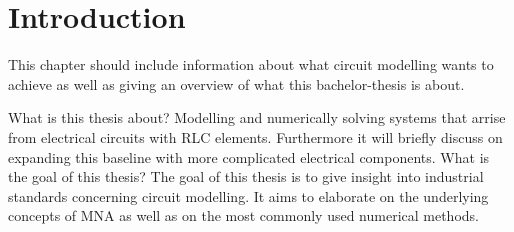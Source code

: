 \section{Introduction}
	This chapter should include information about what circuit modelling wants to achieve as well as giving an overview of what this bachelor-thesis is about.

What is this thesis about? \newline
	Modelling and numerically solving systems that arrise from electrical circuits with RLC elements. Furthermore it will briefly discuss on expanding this baseline with more complicated electrical components.
What is the goal of this thesis?\newline
	The goal of this thesis is to give insight into industrial standards concerning circuit modelling. It aims to elaborate on the underlying concepts of MNA as well as on the most commonly used numerical methods.
